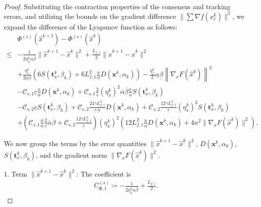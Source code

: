 \documentclass[10pt,a4paper]{amsart}
\begin{document}
\begin{proof}
    Substituting the contraction properties of the consensus and tracking errors, and utilizing the bounds on the gradient difference $\|\sum \nabla f(x_\ell^k)\|^2$, we expand the difference of the Lyapunov function as follows:
    \begin{align*}
        &\Phi^{(s)}({\hat{x}}^{k+1}) - \Phi^{(s)}({\hat{x}}^{k}) \\
        \leq{}& -\frac{1}{2\eta_x^{k}\overline{\alpha}\overline{\beta}} \|\hat{x}^{k+1}-\hat{x}^{k}\|^{2} + \frac{L_{f,1}}{2} \|\hat{x}^{k+1}-\hat{x}^{k}\|^{2} \\
        &+ \frac{\eta_x^{k}}{2\underline{\alpha}\underline{\beta}} \left( 6S(\mathbf{t}_{x}^{k},\beta_{k}) + 6L_{f,1}^{2} \frac{n}{\underline{\alpha}}  D(\mathbf{x}^{k},\alpha_{k}) \right) - \frac{\eta_x^{k}}{2}\underline{\alpha}\underline{\beta} \left\| \nabla_{x}F(\hat{x}^{k}) \right\|^{2} \\
        &- \mathcal{C}_{s,1} \underline{c} \frac{n}{\underline{\alpha}} D(\mathbf{x}^{k}, \alpha_{k}) + \mathcal{C}_{s,1} \frac{2}{\underline{c}}(\eta_{x}^{k})^{2} \overline{\alpha}\overline{\beta} \frac{n}{\underline{\alpha}}S(\mathbf{t}_{x}^{k}, \beta_{k}) \\
        &- \mathcal{C}_{s,2} \underline{e} S(\mathbf{t}_{x}^{k},\beta_{k}) + \mathcal{C}_{s,2} \frac{24\gamma L_{f,1}^{2}}{\underline{e}\, \underline{\alpha}} D(\mathbf{x}^{k}, \alpha_{k}) + \mathcal{C}_{s,2} \frac{12\gamma L_{f,1}^2}{\underline{e}} (\eta_{x}^{k})^{2} S(\mathbf{t}_{x}^{k},\beta_{k}) \\
        &+ \left( \mathcal{C}_{s,1}\frac{n}{\underline{\alpha}} \frac{2}{\underline{c}} \overline{\alpha}\overline{\beta} + \mathcal{C}_{s,2} \frac{12\gamma L_{f,1}^{2}}{\underline{e}} \right)(\eta_{x}^{k})^{2} \left( 12 L_{f,1}^{2}\frac{n}{\underline{\alpha}}D(\mathbf{x}^{k}, \alpha_{k}) + 4n^{2}\big\| \nabla_{x} F({\hat{x}}^k) \big\|^{2} \right).
    \end{align*}
    
    We now group the terms by the error quantities $\|\hat{x}^{k+1}-\hat{x}^{k}\|^{2}$, $D(\mathbf{x}^{k}, \alpha_{k})$, $S(\mathbf{t}_{x}^{k},\beta_{k})$, and the gradient norm $\|\nabla_{x} F({\hat{x}}^k)\|^{2}$.
    
    1. Term $\|\hat{x}^{k+1}-\hat{x}^{k}\|^{2}$: The coefficient is
    \begin{align*}
       C_{\Phi,1}^{(s)} \coloneqq -\frac{1}{2\eta_x^{k}\overline{\alpha}\overline{\beta}} + \frac{L_{f,1}}{2}.
    \end{align*}
    

\end{proof}
\end{document}
